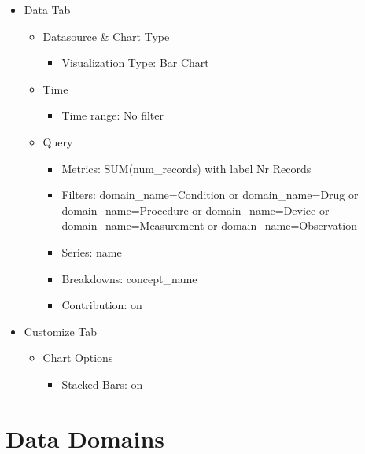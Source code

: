 \documentclass[
]{book}
\providecommand{\tightlist}{%
  \setlength{\itemsep}{0pt}\setlength{\parskip}{0pt}}
\begin{document}
\begin{itemize}
\tightlist
\item
  Data Tab

  \begin{itemize}
  \tightlist
  \item
    Datasource \& Chart Type

    \begin{itemize}
    \tightlist
    \item
      Visualization Type: Bar Chart
    \end{itemize}
  \item
    Time

    \begin{itemize}
    \tightlist
    \item
      Time range: No filter
    \end{itemize}
  \item
    Query

    \begin{itemize}
    \tightlist
    \item
      Metrics: SUM(num\_records) with label Nr Records
    \item
      Filters: domain\_name=Condition or domain\_name=Drug or domain\_name=Procedure or domain\_name=Device or domain\_name=Measurement or domain\_name=Observation
    \item
      Series: name
    \item
      Breakdowns: concept\_name
    \item
      Contribution: on
    \end{itemize}
  \end{itemize}
\item
  Customize Tab

  \begin{itemize}
  \tightlist
  \item
    Chart Options

    \begin{itemize}
    \tightlist
    \item
      Stacked Bars: on
    \end{itemize}
  \end{itemize}
\end{itemize}

\hypertarget{data-domains}{%
\section{Data Domains}\label{data-domains}}
\end{document}
